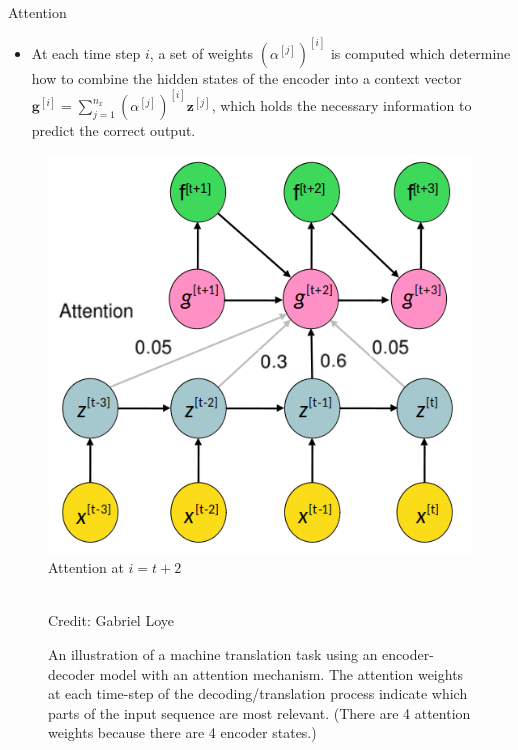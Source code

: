 \begin{vbframe}{Attention}
\framebreak
\begin{itemize}  
    \item At each time step $i$, a set of weights $(\alpha^{[j]})^{[i]}$ is computed which determine how to combine the hidden states of the encoder into a context vector $\mathbf{g}^{[i]}= \sum_{j=1}^{n_x} (\alpha^{[j]})^{[i]} \mathbf{z}^{[j]}$, which holds the necessary information to predict the correct output.
  \end{itemize}
  \begin{figure}
    \includegraphics[width=5.cm]{figure/seq2seq_4.png}
    \caption{Attention at $i=t+2$}
  \end{figure}
  
\framebreak
  
  \lz
  \lz
  \begin{figure}
    \centering
    \tiny{\\Credit: Gabriel Loye}
    \caption{\footnotesize An illustration of a machine translation task using an encoder-decoder model with an attention mechanism. The attention weights at each time-step of the decoding/translation process indicate which parts of the input sequence are most relevant. (There are 4 attention weights because there are 4 encoder states.)}
  \end{figure}
  
  
\end{vbframe}

